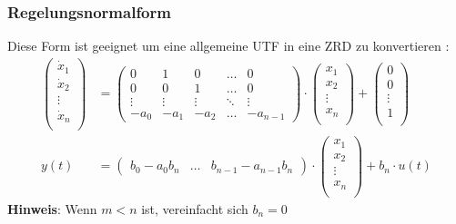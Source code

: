 \subsubsection{Regelungsnormalform}
Diese Form ist geeignet um eine allgemeine UTF in eine ZRD zu konvertieren :
\begin{align*}
 \begin{pmatrix}  \dot{x}_1 \\ 	\dot{x}_2 \\ \vdots \\ \dot{x}_n \\ \end{pmatrix}
 &=
 \begin{pmatrix}
 	0 & 1 & 0 & \dots & 0\\
 	0 & 0 & 1 & \dots & 0\\
 	\vdots & \vdots & \vdots & \ddots & \vdots \\
 	-a_0 & -a_1 & -a_2 & \dots & -a_{n-1}
 \end{pmatrix}\cdot
\begin{pmatrix}  {x}_1 \\ 	{x}_2 \\ \vdots\\ {x}_n \\ \end{pmatrix} +
\begin{pmatrix}  0 \\ 0 \\ \vdots \\1 \\ \end{pmatrix}
\\
y(t) &= \begin{pmatrix}
	b_0-a_0b_n & \dots & b_{n-1}-a_{n-1}b_n
\end{pmatrix}\cdot
\begin{pmatrix}  {x}_1 \\ 	{x}_2 \\ \vdots\\ {x}_n \\ \end{pmatrix}
+ {b_n}\cdot u(t)
\end{align*}
\textbf{Hinweis}: Wenn $m<n$ ist, vereinfacht sich $b_n = 0$

